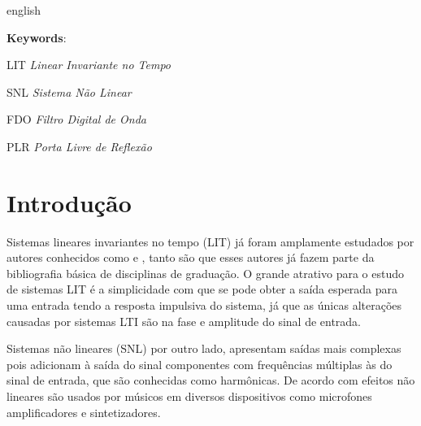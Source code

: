 \begin{resumo}[Abstract]
 \begin{otherlanguage*}{english}
	
   \vspace{\onelineskip}
   \noindent 
   \textbf{Keywords}:
 \end{otherlanguage*}
\end{resumo}


\listoffigures*
\cleardoublepage

\listoftables*
\cleardoublepage

\begin{siglas}
	\item[LIT]		\emph{Linear Invariante no Tempo}
	\item[SNL]		\emph{Sistema Não Linear}
	\item[FDO]		\emph{Filtro Digital de Onda}
	\item[PLR]		\emph{Porta Livre de Reflexão}

\end{siglas}

\tableofcontents*
\cleardoublepage

\textual
	\chapter{Introdução}

Sistemas lineares invariantes no tempo (LIT) já foram amplamente estudados por autores conhecidos como  e  , tanto são que esses autores já fazem parte da bibliografia básica de disciplinas de graduação. O grande atrativo para o estudo de sistemas LIT é a simplicidade com que se pode obter a saída esperada para uma entrada tendo a resposta impulsiva do sistema, já que as únicas alterações causadas por sistemas LTI são na fase e amplitude do sinal de entrada.

Sistemas não lineares (SNL) por outro lado, apresentam saídas mais complexas pois adicionam à saída do sinal componentes com frequências múltiplas às do sinal de entrada, que são conhecidas como harmônicas. De acordo com  efeitos não lineares são usados por músicos em diversos dispositivos como microfones amplificadores e sintetizadores.

